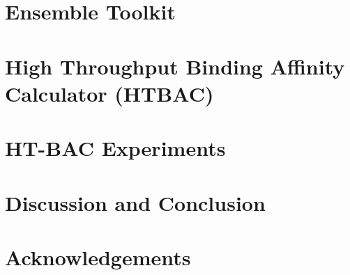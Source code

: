 \documentclass[conference]{IEEEtran}
\begin{document}
\section{Ensemble Toolkit}\label{sec:4}




\section{High Throughput Binding Affinity Calculator (HTBAC)}\label{sec:5}



\section{HT-BAC Experiments}\label{sec:6}



\section{Discussion and Conclusion}\label{sec:conclusion}



\section*{Acknowledgements}





\end{document}
